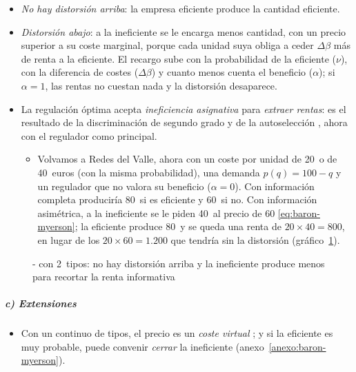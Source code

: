 \documentclass[11pt]{article}
\begin{document}
\begin{itemize}
\item \emph{No hay distorsión arriba}: la empresa eficiente produce la cantidad eficiente.
\item \emph{Distorsión abajo}: a la ineficiente se le encarga menos cantidad, con un precio superior a su coste marginal, porque cada unidad suya obliga a ceder $\Delta\beta$ más de renta a la eficiente. El recargo sube con la probabilidad de la eficiente ($\nu$), con la diferencia de costes ($\Delta\beta$) y cuanto menos cuenta el beneficio ($\alpha$); si $\alpha=1$, las rentas no cuestan nada y la distorsión desaparece.
\item La regulación óptima acepta \emph{ineficiencia asignativa} para \emph{extraer rentas}: es el resultado de la discriminación de segundo grado  y de la autoselección , ahora con el regulador como principal.
  \begin{itemize}
  \item Volvamos a Redes del Valle, ahora con un coste por unidad de 20~o de 40~euros (con la misma probabilidad), una demanda $p(q)=100-q$ y un regulador que no valora su beneficio ($\alpha=0$). Con información completa produciría 80~si es eficiente y 60~si no. Con información asimétrica, a la ineficiente se le piden 40~al precio de 60 \eqref{eq:baron-myerson}; la eficiente produce 80~y se queda una renta de $20\times 40=800$, en lugar de los $20\times 60=1.200$ que tendría sin la distorsión (gráfico~\ref{fig:baron-myerson}).
  \end{itemize}
\end{itemize}

\begin{figure}[H]
\centering
\caption{- con 2~tipos: no hay distorsión arriba y la ineficiente produce menos para recortar la renta informativa}\label{fig:baron-myerson}
\end{figure}

\subparagraph{c) Extensiones}

\begin{itemize}
\item Con un continuo de tipos, el precio es un \emph{coste virtual} ; y si la eficiente es muy probable, puede convenir \emph{cerrar} la ineficiente (anexo~\ref{anexo:baron-myerson}).
\end{itemize}
\end{document}

